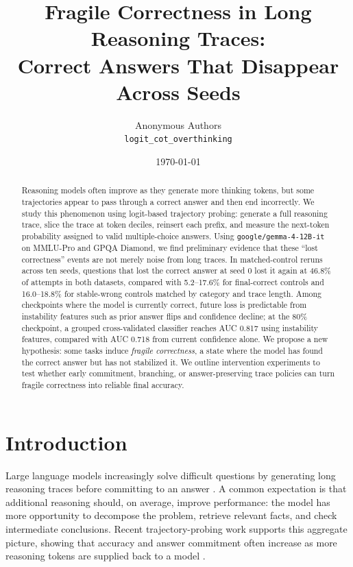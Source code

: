 \documentclass[11pt]{article}
\title{Fragile Correctness in Long Reasoning Traces:\\
Correct Answers That Disappear Across Seeds}
\author{
  Anonymous Authors\\
  \texttt{logit\_cot\_overthinking}
}
\date{\today}
\begin{document}
\maketitle

\begin{abstract}
Reasoning models often improve as they generate more thinking tokens, but
some trajectories appear to pass through a correct answer and then end
incorrectly. We study this phenomenon using logit-based trajectory probing:
generate a full reasoning trace, slice the trace at token deciles, reinsert
each prefix, and measure the next-token probability assigned to valid
multiple-choice answers. Using \texttt{google/gemma-4-12B-it} on MMLU-Pro and
GPQA Diamond, we find preliminary evidence that these ``lost correctness''
events are not merely noise from long traces. In matched-control reruns across
ten seeds, questions that lost the correct answer at seed 0 lost it again at
46.8\% of attempts in both datasets, compared with 5.2--17.6\% for
final-correct controls and 16.0--18.8\% for stable-wrong controls matched by
category and trace length. Among checkpoints where the model is currently
correct, future loss is predictable from instability features such as prior
answer flips and confidence decline; at the 80\% checkpoint, a grouped
cross-validated classifier reaches AUC 0.817 using instability features,
compared with AUC 0.718 from current confidence alone. We propose a new
hypothesis: some tasks induce \emph{fragile correctness}, a state where the
model has found the correct answer but has not stabilized it. We outline
intervention experiments to test whether early commitment, branching, or
answer-preserving trace policies can turn fragile correctness into reliable
final accuracy.
\end{abstract}

\section{Introduction}

Large language models increasingly solve difficult questions by generating
long reasoning traces before committing to an answer
\citep{wei2022chain,wang2022selfconsistency}. A common expectation is that
additional reasoning should, on average, improve performance: the model has
more opportunity to decompose the problem, retrieve relevant facts, and check
intermediate conclusions. Recent trajectory-probing work supports this
aggregate picture, showing that accuracy and answer commitment often increase
as more reasoning tokens are supplied back to a model \citep{ballon2026probing}.
\end{document}
